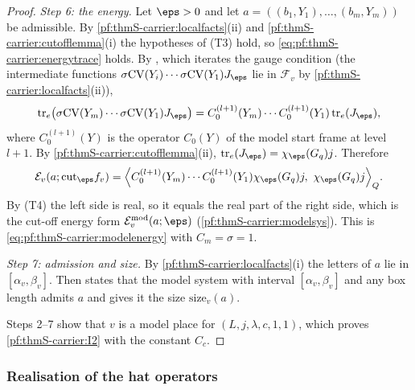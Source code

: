 \begin{proof}
\emph{Step 6: the energy.} Let $\eps>0$ and let $a=((b_1,Y_1),\dots,(b_m,Y_m))$ be admissible. By
\cref{pf:thmS-carrier:localfacts}(ii) and \cref{pf:thmS-carrier:cutofflemma}(i) the hypotheses of (T3) hold, so
\eqref{eq:pf:thmS-carrier:energytrace} holds. By , which iterates the
gauge condition (the intermediate functions $\sigma\mathrm{CV}(Y_i)\cdots\sigma\mathrm{CV}(Y_1)J_\eps$ lie in $\mathcal F_v$
by \cref{pf:thmS-carrier:localfacts}(ii)),
\[
\mathrm{tr}_e\bigl(\sigma\mathrm{CV}(Y_m)\cdots\sigma\mathrm{CV}(Y_1)J_\eps\bigr)=C^{(l+1)}_0(Y_m)\cdots C^{(l+1)}_0(Y_1)\,
\mathrm{tr}_e(J_\eps),
\]
where $C^{(l+1)}_0(Y)$ is the operator $C_0(Y)$ of the model start frame at level $l+1$. By
\cref{pf:thmS-carrier:cutofflemma}(ii), $\mathrm{tr}_e(J_\eps)=\chi_\eps(G_q)j$. Therefore
\[
\mathcal E_v(a;\mathrm{cut}_\eps f_v)=\Bigl\langle C^{(l+1)}_0(Y_m)\cdots C^{(l+1)}_0(Y_1)\chi_\eps(G_q)j,\ \chi_\eps(G_q)j
\Bigr\rangle_Q .
\]
By (T4) the left side is real, so it equals the real part of the right side, which is the cut-off energy form
$\thmScarrierEn^{\mathrm{mod}}_v(a;\eps)$ (\cref{pf:thmS-carrier:modelsys}). This is \eqref{eq:pf:thmS-carrier:modelenergy}
with $C_m=\sigma=1$.

\emph{Step 7: admission and size.} By \cref{pf:thmS-carrier:localfacts}(i) the letters of $a$ lie in $[\alpha_v,\beta_v]$.
Then  states that the model system with interval
$[\alpha_v,\beta_v]$ and any box length admits $a$ and gives it the size $\mathrm{size}_v(a)$.

Steps 2--7 show that $v$ is a model place for $(L,j,\lambda,c,1,1)$, which proves \ref{pf:thmS-carrier:I2} with the
constant $C_c$.
\end{proof}

\subsubsection{Realisation of the hat operators}

